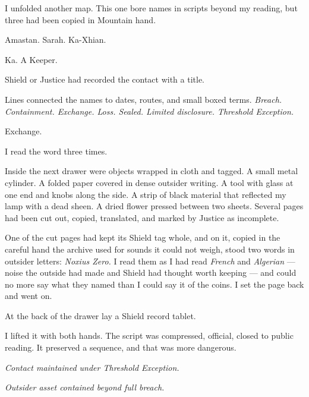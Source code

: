 I unfolded another map. This one bore names in scripts beyond my reading, but three had been copied in Mountain hand.\par

Amastan. Sarah. Ka-Xhian.\par

Ka. A Keeper.\par

Shield or Justice had recorded the contact with a title.\par

Lines connected the names to dates, routes, and small boxed terms. \textit{Breach. Containment. Exchange. Loss. Sealed. Limited disclosure. Threshold Exception.}\par

Exchange.\par

I read the word three times.\par

Inside the next drawer were objects wrapped in cloth and tagged. A small metal cylinder. A folded paper covered in dense outsider writing. A tool with glass at one end and knobs along the side. A strip of black material that reflected my lamp with a dead sheen. A dried flower pressed between two sheets. Several pages had been cut out, copied, translated, and marked by Justice as incomplete.\par

One of the cut pages had kept its Shield tag whole, and on it, copied in the careful hand the archive used for sounds it could not weigh, stood two words in outsider letters: \textit{Noxius Zero.} I read them as I had read \textit{French} and \textit{Algerian} --- noise the outside had made and Shield had thought worth keeping --- and could no more say what they named than I could say it of the coins. I set the page back and went on.\par

At the back of the drawer lay a Shield record tablet.\par

I lifted it with both hands. The script was compressed, official, closed to public reading. It preserved a sequence, and that was more dangerous.\par

\textit{Contact maintained under Threshold Exception.}\par

\textit{Outsider asset contained beyond full breach.}\par

